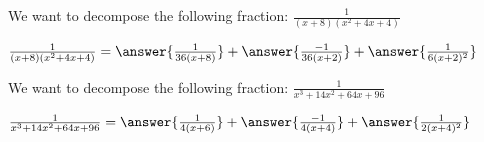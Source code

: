 \documentclass{ximera}
\begin{document}
\begin{exercise}


We want to decompose the following fraction: 
$\frac{1}{(x+8)(x^2+4x+4)} $

$
\frac{1}{(x+8)(x^2+4x+4)} =
 \answer{\frac{1}{36(x+8)}} +
\answer{\frac{-1}{36(x+2)}} + 
\answer{\frac{1}{6(x+2)^2}}
$


\end{exercise}


\begin{exercise}


We want to decompose the following fraction: 
$\frac{1}{x^3+14x^2+64x+96} $

$
\frac{1}{x^3+14x^2+64x+96} =
 \answer{\frac{1}{4(x+6)}} +
\answer{\frac{-1}{4(x+4)}} + 
\answer{\frac{1}{2(x+4)^2}}
$


\end{exercise}
\end{document}
